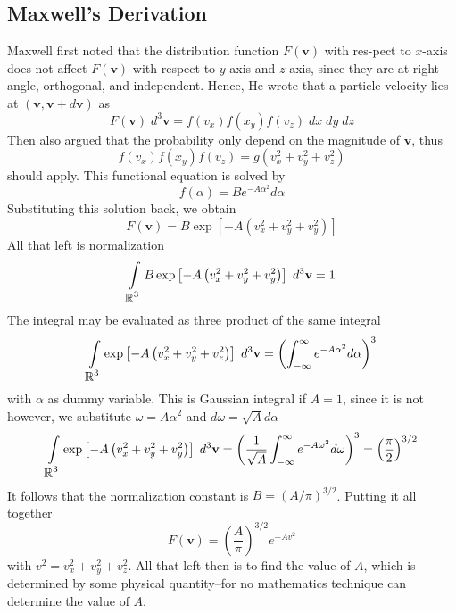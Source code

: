 \documentclass[../../../Main.tex]{subfiles}
\begin{document}
\subsection*{Maxwell's Derivation}
Maxwell first noted that the distribution function $F(\mathbf{v})$ with res-pect to $x$-axis does not affect $F(\mathbf{v})$ with respect to $y$-axis and $z$-axis, since they are at right angle, orthogonal, and independent. Hence, He wrote that a particle velocity lies at $(\mathbf{v}, \mathbf{v}+d\mathbf{v})$ as 
\begin{equation*}
    F(\mathbf{v})\;d^3\mathbf{v}=f(v_x)f(x_y)f(v_z)\;dx\;dy\;dz
\end{equation*}
Then also argued that the probability only depend on the magnitude of $\mathbf{v}$, thus
\begin{equation*}
    f(v_x)f(x_y)f(v_z)= g(v_x^2+v_y^2+v_z^2)
\end{equation*}
should apply. This functional equation is solved by
\begin{equation*}
    f(\alpha)=Be^{-A\alpha^2}d\alpha
\end{equation*}
Substituting this solution back, we obtain 
\begin{equation*}
    F(\mathbf{v})=B \exp \left[-A\left(v_x^2+v_y^2+v_y^2\right)\right]
\end{equation*}
All that left is normalization
\begin{equation*}
    \int\displaylimits_{\displaystyle\mathbb{R}^3} B \exp \left[-A\left(v_x^2+v_y^2+v_y^2\right)\right]\; d^3\mathbf{v}=1
\end{equation*}
The integral may be evaluated as three product of the same integral
\begin{equation*}
    \int\displaylimits_{\displaystyle\mathbb{R}^3} \exp \left[-A\left(v_x^2+v_y^2+v_z^2\right)\right]\; d^3\mathbf{v} = \left(\int_{-\infty}^{\infty}e^{-A\alpha^2}d\alpha \right)^3
\end{equation*}
with $\alpha$ as dummy variable. This is Gaussian integral if $A=1$, since it is not however, we substitute $\omega=A\alpha^2$ and $d\omega=\sqrt{A}d\alpha$
\begin{equation*}
    \int\displaylimits_{\displaystyle\mathbb{R}^3} \exp \left[-A\left(v_x^2+v_y^2+v_y^2\right)\right]\; d^3\mathbf{v} = \left(\frac{1}{\sqrt{A}}\int_{-\infty}^{\infty}e^{-A\omega^2}d\omega\right)^3=\left(\frac{\pi}{2}\right)^{3/2}
\end{equation*}
It follows that the normalization constant is $B=(A/\pi)^{3/2}$. Putting it all together
\begin{equation*}
    F(\mathbf{v})= \left(\frac{A}{\pi}\right)^{3/2}e^{-Av^2}
\end{equation*}
with $v^2=v_x^2+v_y^2+v_z^2$. All that left then is to find the value of $A$, which is determined by some physical quantity--for no mathematics technique can determine the value of $A$.
\end{document}
